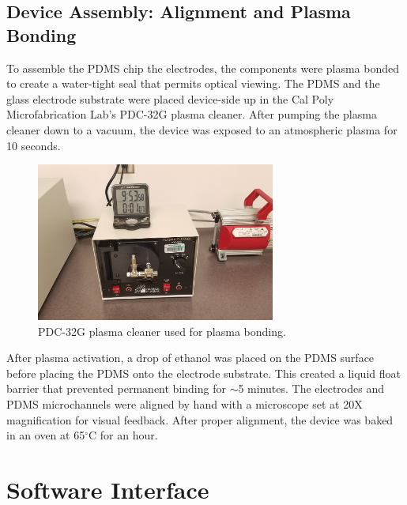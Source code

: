 \FloatBarrier

\subsection{Device Assembly: Alignment and Plasma Bonding}

\par To assemble the PDMS chip the electrodes, the components were plasma bonded to create a water-tight seal that permits optical viewing. The PDMS and the glass electrode substrate were placed device-side up in the Cal Poly Microfabrication Lab's PDC-32G plasma cleaner. After pumping the plasma cleaner down to a vacuum, the device was exposed to an atmospheric plasma for 10 seconds.  

\begin{figure}[h]
    \centering
    \includegraphics[width=0.7\textwidth]{images/plasma_cleaner.jpg}
    \caption[PDC-32G plasma cleaner]{PDC-32G plasma cleaner used for plasma bonding.}
    \label{fig:pdc_plasma_cleaner}
\end{figure}

\par After plasma activation, a drop of ethanol was placed on the PDMS surface before placing the PDMS onto the electrode substrate. This created a liquid float barrier that prevented permanent binding for $\sim$5 minutes. The electrodes and PDMS microchannels were aligned by hand with a microscope set at 20X magnification for visual feedback. After proper alignment, the device was baked in an oven at 65$^\circ$C for an hour. 
\FloatBarrier

\section[Software]{Software Interface}

